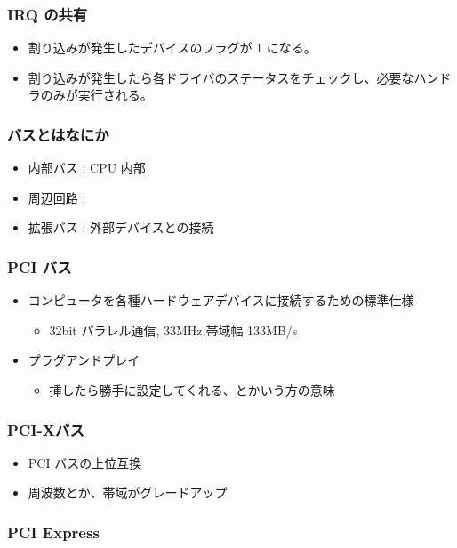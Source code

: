 \documentclass{jsarticle}
\begin{document}
\subsubsection{IRQ の共有}

\begin{itemize}
\item
  割り込みが発生したデバイスのフラグが 1 になる。
\item
  割り込みが発生したら各ドライバのステータスをチェックし、必要なハンドラのみが実行される。
\end{itemize}
\subsubsection{バスとはなにか}

\begin{itemize}
\item
  内部バス : CPU 内部
\item
  周辺回路 :
\item
  拡張バス : 外部デバイスとの接続
\end{itemize}
\subsubsection{PCI バス}

\begin{itemize}
\item
  コンピュータを各種ハードウェアデバイスに接続するための標準仕様
  \begin{itemize}
  \item
    32bit パラレル通信, 33MHz,帯域幅 133MB/s
  \end{itemize}
\item
  プラグアンドプレイ
  \begin{itemize}
  \item
    挿したら勝手に設定してくれる、とかいう方の意味
  \end{itemize}
\end{itemize}
\subsubsection{PCI-Xバス}

\begin{itemize}
\item
  PCI バスの上位互換
\item
  周波数とか、帯域がグレードアップ
\end{itemize}
\subsubsection{PCI Express}
\end{document}
